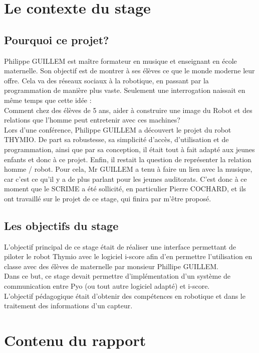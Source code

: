 \documentclass[a4paper, 12pt]{report}
\begin{document}
\section{Le contexte du stage}
\subsection{Pourquoi ce projet?}

Philippe GUILLEM est maître formateur en musique et enseignant en école maternelle. Son objectif est de montrer à ses élèves ce que le monde moderne leur offre. Cela va des réseaux sociaux à la robotique, en passant par la programmation de manière plus vaste. Seulement une interrogation naissait en même temps que cette idée :\\

Comment chez des élèves de 5 ans, aider à construire une image du Robot et des relations que l'homme peut entretenir avec ces machines?\\

Lors d'une conférence, Philippe GUILLEM a découvert le projet du robot THYMIO. De part sa robustesse, sa simplicité d'accès, d'utilisation et de programmation, ainsi que par sa conception, il était tout à fait adapté aux jeunes enfants et donc à ce projet.
Enfin, il restait la question de représenter la relation homme / robot. Pour cela, Mr GUILLEM a tenu à faire un lien avec la musique, car c'est ce qu'il y a de plus parlant pour les jeunes auditorats. C'est donc à ce moment que le SCRIME a été sollicité, en particulier Pierre COCHARD, et ils ont travaillé sur le projet de ce stage, qui finira par m'être proposé.


\subsection{Les objectifs du stage}
L'objectif principal de ce stage était de réaliser une interface permettant de piloter le robot Thymio avec le logiciel i-score afin d'en permettre l'utilisation en classe avec des élèves de maternelle par monsieur Phillipe GUILLEM. \\
Dans ce but, ce stage devait permettre d'implémentation d'un système de communication entre Pyo (ou tout autre logiciel adapté) et i-score.\\
L'objectif pédagogique était d'obtenir des compétences en robotique et dans le traitement des informations d'un capteur. 

\section{Contenu du rapport}
\end{document}
